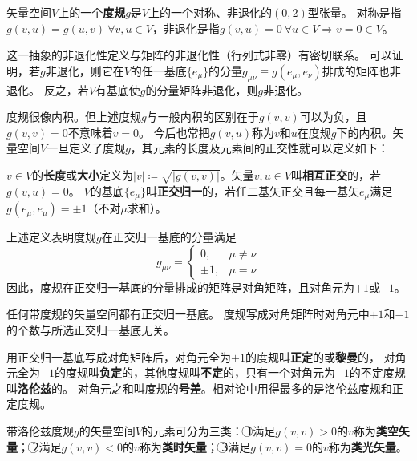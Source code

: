 \begin{definition}
矢量空间$V$上的一个\textbf{度规}$g$是$V$上的一个对称、非退化的$(0, 2)$型张量。
对称是指$g(v, u) = g(u, v) ~ \forall v, u \in V$，非退化是指$g(v, u) = 0 ~ \forall u \in V \Rightarrow v = 0 \in V$。
\end{definition}

\begin{note}
这一抽象的非退化性定义与矩阵的非退化性（行列式非零）有密切联系。
可以证明，若$g$非退化，则它在$V$的任一基底$\{e_\mu\}$的分量$g_{\mu\nu} \equiv g(e_\mu, e_\nu)$排成的矩阵也非退化。
反之，若$V$有基底使$g$的分量矩阵非退化，则$g$非退化。
\end{note}

度规很像内积。但上述度规$g$与一般内积的区别在于$g(v, v)$可以为负，且$g(v, v) = 0$不意味着$v = 0$。
今后也常把$g(v, u)$称为$v$和$u$在度规$g$下的内积。矢量空间$V$一旦定义了度规$g$，其元素的长度及元素间的正交性就可以定义如下：

\begin{definition}
$v \in V$的\textbf{长度}或\textbf{大小}定义为$|v| \coloneq \sqrt{|g(v, v)|}$。矢量$v, u \in V$叫\textbf{相互正交}的，若$g(v, u) = 0$。
$V$的基底$\{e_\mu\}$叫\textbf{正交归一}的，若任二基矢正交且每一基矢$e_\mu$满足$g(e_\mu, e_\mu) = \pm 1$（不对$\mu$求和）。
\end{definition}

\begin{note}
上述定义表明度规$g$在正交归一基底的分量满足
$$
g_{\mu\nu} =
\begin{cases}
0, & \mu \neq \nu \\
\pm 1, & \mu = \nu
\end{cases}
$$
因此，度规在正交归一基底的分量排成的矩阵是对角矩阵，且对角元为$+1$或$-1$。
\end{note}

\begin{theorem}
任何带度规的矢量空间都有正交归一基底。
度规写成对角矩阵时对角元中$+1$和$-1$的个数与所选正交归一基底无关。
\end{theorem}

\begin{definition}
用正交归一基底写成对角矩阵后，对角元全为$+1$的度规叫\textbf{正定}的或\textbf{黎曼}的，
对角元全为$-1$的度规叫\textbf{负定}的，其他度规叫\textbf{不定}的，只有一个对角元为$-1$的不定度规叫\textbf{洛伦兹}的。
对角元之和叫度规的\textbf{号差}。相对论中用得最多的是洛伦兹度规和正定度规。
\end{definition}

\begin{definition}
带洛伦兹度规$g$的矢量空间$V$的元素可分为三类：
\textcircled{1}满足$g(v, v) > 0$的$v$称为\textbf{类空矢量}；
\textcircled{2}满足$g(v, v) < 0$的$v$称为\textbf{类时矢量}；
\textcircled{3}满足$g(v, v) = 0$的$v$称为\textbf{类光矢量}。
\end{definition}

